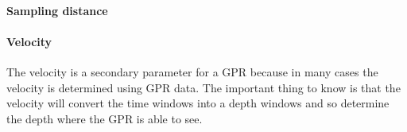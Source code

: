\paragraph{Sampling distance}

\paragraph{Velocity} The velocity is a secondary parameter for a GPR because in many cases the velocity is determined using GPR data. The important thing to know is that the velocity will convert the time windows into a depth windows and so determine the depth where the GPR is able to see.


